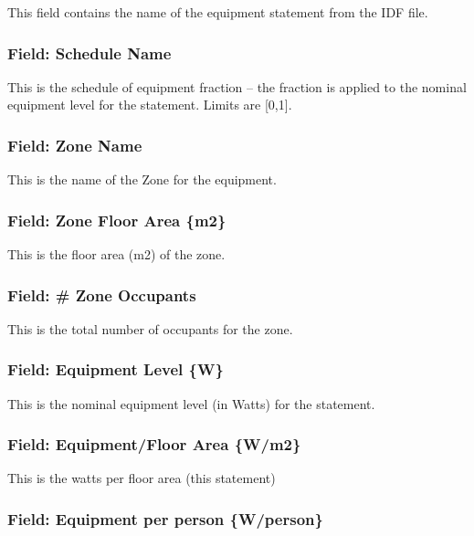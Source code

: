 This field contains the name of the equipment statement from the IDF file.

\subsubsection{Field: Schedule Name}\label{field-schedule-name-2}

This is the schedule of equipment fraction -- the fraction is applied to the nominal equipment level for the statement. Limits are {[}0,1{]}.

\subsubsection{Field: Zone Name}\label{field-zone-name-4}

This is the name of the Zone for the equipment.

\subsubsection{Field: Zone Floor Area \{m2\}}\label{field-zone-floor-area-m2-2}

This is the floor area (m2) of the zone.

\subsubsection{Field: \# Zone Occupants}\label{field-zone-occupants-2}

This is the total number of occupants for the zone.

\subsubsection{Field: Equipment Level \{W\}}\label{field-equipment-level-w}

This is the nominal equipment level (in Watts) for the statement.

\subsubsection{Field: Equipment/Floor Area \{W/m2\}}\label{field-equipmentfloor-area-wm2}

This is the watts per floor area (this statement)

\subsubsection{Field: Equipment per person \{W/person\}}\label{field-equipment-per-person-wperson}


